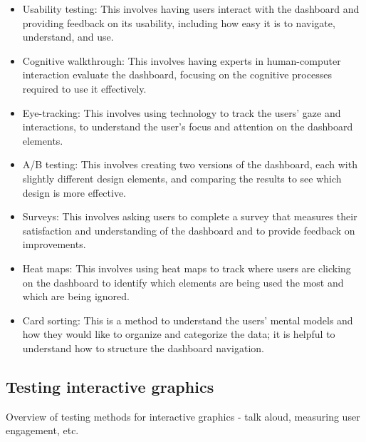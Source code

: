 \documentclass[print]{nuthesis}
\providecommand{\tightlist}{%
  \setlength{\itemsep}{0pt}\setlength{\parskip}{0pt}}
\begin{document}
\begin{itemize}
\tightlist
\item
  Usability testing: This involves having users interact with the dashboard and providing feedback on its usability, including how easy it is to navigate, understand, and use.
\item
  Cognitive walkthrough: This involves having experts in human-computer interaction evaluate the dashboard, focusing on the cognitive processes required to use it effectively.
\item
  Eye-tracking: This involves using technology to track the users' gaze and interactions, to understand the user's focus and attention on the dashboard elements.
\item
  A/B testing: This involves creating two versions of the dashboard, each with slightly different design elements, and comparing the results to see which design is more effective.
\item
  Surveys: This involves asking users to complete a survey that measures their satisfaction and understanding of the dashboard and to provide feedback on improvements.
\item
  Heat maps: This involves using heat maps to track where users are clicking on the dashboard to identify which elements are being used the most and which are being ignored.
\item
  Card sorting: This is a method to understand the users' mental models and how they would like to organize and categorize the data; it is helpful to understand how to structure the dashboard navigation.
\end{itemize}



\hypertarget{testing-interactive-graphics}{%
\subsection{Testing interactive graphics}\label{testing-interactive-graphics}}

Overview of testing methods for interactive graphics - talk aloud, measuring user engagement, etc.
\end{document}
